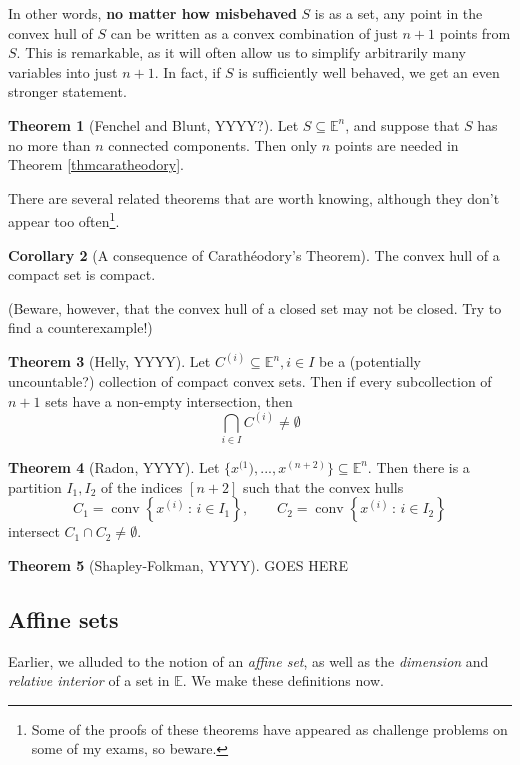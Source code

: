 \documentclass{article}
\numberwithin{equation}{section}
\theoremstyle{definition}
\newtheorem{theorem}{Theorem}[section]
\newtheorem{corollary}[theorem]{Corollary}
\newcommand{\bE}{\mathbb{E}}
\newcommand{\set}[2]{\left\{#1\,:\,#2\right\}}
\newcommand{\conv}{\operatorname{conv}}
\begin{document}
In other words, \textbf{no matter how misbehaved} $S$ is as a set, any point in the convex hull of $S$ can be written as a convex combination of just $n+1$ points from $S$. This is remarkable, as it will often allow us to simplify arbitrarily many variables into just $n+1$. In fact, if $S$ is sufficiently well behaved, we get an even stronger statement.
\begin{theorem}[Fenchel and Blunt, YYYY?]
    Let $S\subseteq\bE^n$, and suppose that $S$ has no more than $n$ connected components. Then only $n$ points are needed in Theorem \ref{thmcaratheodory}.
\end{theorem}
There are several related theorems that are worth knowing, although they don't appear too often\footnote{Some of the proofs of these theorems have appeared as challenge problems on some of my exams, so beware.}.
\begin{corollary}[A consequence of Carath\'eodory's Theorem]
    The convex hull of a compact set is compact.
\end{corollary}
(Beware, however, that the convex hull of a closed set may not be closed. Try to find a counterexample!)
\begin{theorem}[Helly, YYYY]
    Let $C^{(i)}\subseteq \bE^n, i\in I$ be a (potentially uncountable?) collection of compact convex sets. Then if every subcollection of $n+1$ sets have a non-empty intersection, then
    \begin{equation}
        \bigcap_{i\in I} C^{(i)}\neq \emptyset
    \end{equation}
\end{theorem}
\begin{theorem}[Radon, YYYY]
    Let $\{x^{(1}), ..., x^{(n+2)}\}\subseteq\bE^n$. Then there is a partition $I_1, I_2$ of the indices $[n+2]$ such that the convex hulls
    \begin{equation}
    C_1=\conv\set{x^{(i)}}{i\in I_1},\qquad C_2=\conv\set{x^{(i)}}{i\in I_2}
    \end{equation}
    intersect $C_1\cap C_2\neq\emptyset$.
\end{theorem}
\begin{theorem}[Shapley-Folkman, YYYY]
    GOES HERE
\end{theorem}
\subsection{Affine sets}
Earlier, we alluded to the notion of an \textit{affine set}, as well as the \textit{dimension} and \textit{relative interior} of a set in $\bE$. We make these definitions now.
\end{document}
